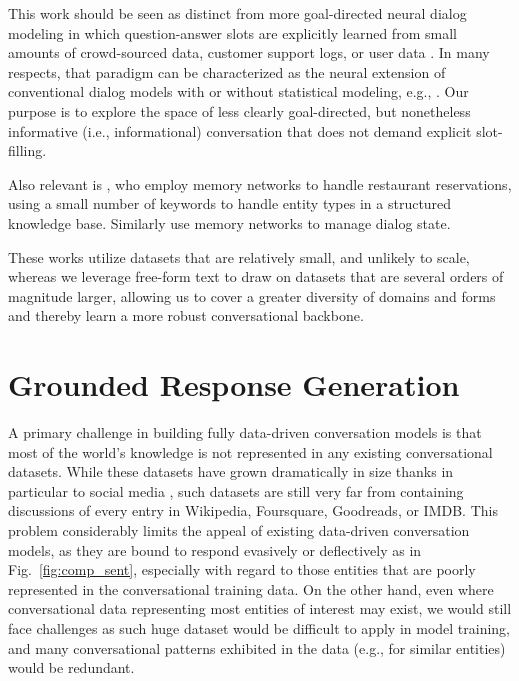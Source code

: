 \documentclass[letterpaper]{article}
\begin{document}
This work should be seen as distinct from more goal-directed neural dialog modeling in which question-answer slots are explicitly learned from small amounts of crowd-sourced data, customer support logs, or user data
\cite{wen-EtAl2015,DBLP:journals/corr/WenGMRSVY16,Wen2017Latent,Zhao2017ACL}. 
In many respects, that paradigm
can be characterized as the neural extension of conventional dialog models with or without statistical modeling, e.g., \cite{OhRudnicky2000,Ratnaparkhi2002,BanchsLi2012,AmeixaCoheurEtAl2014}. 
Our purpose is to explore the space of less clearly goal-directed, but nonetheless informative (i.e., informational) conversation that does not demand explicit slot-filling. 

Also relevant is \cite{BordesW16}, who employ memory networks to handle restaurant reservations, using a small number of keywords to handle entity types in a structured knowledge base. 
Similarly \cite{DBLP:conf/eacl/LiuP17a} use memory networks to manage dialog state. 

These works utilize datasets that are relatively small, and unlikely to scale, whereas 
we leverage free-form text to draw on datasets that are several orders of magnitude larger, 
allowing us to cover a greater diversity of domains and forms and thereby learn a more robust conversational backbone.

\section{Grounded Response Generation}

A primary challenge in building fully data-driven conversation models is that most of the world's knowledge is not represented in any existing conversational datasets.
While these datasets \cite{corpora:2015} have grown dramatically in size thanks in particular to social media \cite{ritter2011data}, such datasets are still very far from containing discussions of every entry in Wikipedia, Foursquare, Goodreads, or IMDB. %
This problem considerably limits the appeal of existing data-driven conversation models, as they are bound to respond evasively or deflectively
as in Fig.~\ref{fig:comp_sent}, especially with regard to those entities that are poorly represented in the conversational training data.
On the other hand, even where conversational data representing most entities of interest may exist, we would still face challenges as such huge dataset would be difficult to apply in model training, and many conversational patterns exhibited in the data (e.g., for similar entities) would be redundant.
\end{document}
